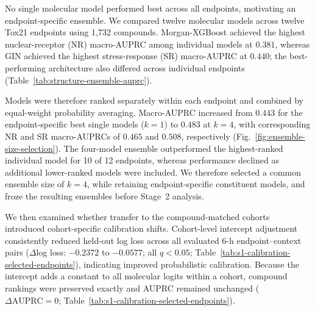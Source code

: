 \documentclass[11pt,a4paper]{article}
\begin{document}
No single molecular model performed best across all endpoints, motivating an endpoint-specific ensemble. We compared twelve molecular models across twelve Tox21 endpoints using 1,732 compounds. Morgan-XGBoost achieved the highest nuclear-receptor (NR) macro-AUPRC among individual models at \(0.381\), whereas GIN achieved the highest stress-response (SR) macro-AUPRC at \(0.440\); the best-performing
architecture also differed across individual endpoints (Table~\ref{tab:structure-ensemble-auprc}).

Models were therefore ranked separately within each endpoint and combined by
equal-weight probability averaging. Macro-AUPRC increased from \(0.443\) for
the endpoint-specific best single models (\(k=1\)) to \(0.483\) at \(k=4\),
with corresponding NR and SR macro-AUPRCs of \(0.465\) and \(0.508\),
respectively (Fig.~\ref{fig:ensemble-size-selection}). The four-model ensemble outperformed the highest-ranked
individual model for 10 of 12 endpoints, whereas performance declined as
additional lower-ranked models were included. We therefore selected a common
ensemble size of \(k=4\), while retaining endpoint-specific constituent
models, and froze the resulting ensembles before Stage~2 analysis.

We then examined whether transfer to the compound-matched cohorts introduced cohort-specific calibration shifts. Cohort-level intercept adjustment consistently reduced held-out log loss across all evaluated 6-h endpoint--context pairs (\(\Delta\)log loss: \(-0.2372\) to \(-0.0577\); all \(q<0.05\); Table~\ref{tab:s1-calibration-selected-endpoints}), indicating improved probabilistic calibration. Because the intercept adds a constant to all molecular logits within a cohort, compound rankings were preserved exactly and AUPRC remained unchanged (\(\Delta\mathrm{AUPRC}=0\); Table~\ref{tab:s1-calibration-selected-endpoints}).

\clearpage
\end{document}

